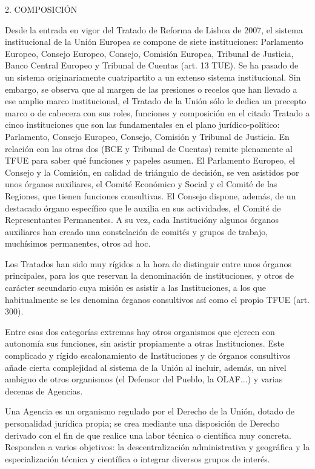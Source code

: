 \documentclass[10pt,a4paper]{article}
\begin{document}
2. COMPOSICIÓN

Desde la entrada en vigor del Tratado de Reforma de Lisboa de 2007, el sistema institucional de la Unión Europea se compone de siete instituciones: Parlamento Europeo, Consejo Europeo, Consejo, Comisión Europea, Tribunal de Justicia, Banco Central Europeo y Tribunal de Cuentas (art. 13 TUE). Se ha pasado de un sistema originariamente cuatripartito a un extenso sistema institucional. Sin embargo, se observa que al margen de las presiones o recelos que han llevado a ese amplio marco institucional, el Tratado de la Unión sólo le dedica un precepto marco o de cabecera con sus roles, funciones y composición en el citado Tratado a cinco instituciones que son las fundamentales en el plano jurídico-político: Parlamento, Consejo Europeo, Consejo, Comisión y Tribunal de Justicia. En relación con las otras dos (BCE y Tribunal de Cuentas) remite plenamente al TFUE para saber qué funciones y papeles asumen. El Parlamento Europeo, el Consejo y la Comisión, en calidad de triángulo de decisión, se ven asistidos por unos órganos auxiliares, el Comité Económico y Social y el Comité de las Regiones, que tienen funciones consultivas. El Consejo dispone, además, de un destacado órgano específico que le auxilia en sus actividades, el Comité de Representantes Permanentes. A su vez, cada Institucióny algunos órganos auxiliares han creado una constelación de comités y grupos de trabajo, muchísimos permanentes, otros ad hoc.

Los Tratados han sido muy rígidos a la hora de distinguir entre unos órganos principales, para los que reservan la denominación de instituciones, y otros de carácter secundario cuya misión es asistir a las Instituciones, a los que habitualmente se les denomina órganos consultivos así como el propio TFUE (art. 300).

Entre esas dos categorías extremas hay otros organismos que ejercen con autonomía sus funciones, sin asistir propiamente a otras Instituciones. Este complicado y rígido escalonamiento de Instituciones y de órganos consultivos añade cierta complejidad al sistema de la Unión al incluir, además, un nivel ambiguo de otros organismos (el Defensor del Pueblo, la OLAF...) y varias decenas de Agencias.

Una Agencia es un organismo regulado por el Derecho de la Unión, dotado de personalidad jurídica propia; se crea mediante una disposición de Derecho derivado con el fin de que realice una labor técnica o científica muy concreta. Responden a varios objetivos: la descentralización administrativa y geográfica y la especialización técnica y científica o integrar diversos grupos de interés.
\end{document}

